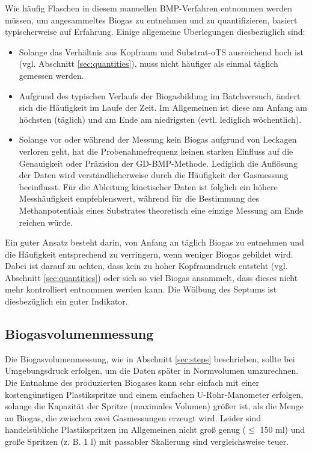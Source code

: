 \documentclass[]{article}
\begin{document}
Wie häufig Flaschen in diesem manuellen BMP-Verfahren entnommen werden müssen, um angesammeltes Biogas zu entnehmen und zu quantifizieren, basiert typischerweise auf Erfahrung.
Einige allgemeine Überlegungen diesbezüglich sind:
\begin{itemize}
\item Solange das Verhältnis aus Kopfraum und Substrat-oTS ausreichend hoch ist (vgl. Abschnitt \ref{sec:quantities}), muss nicht häufiger als einmal täglich gemessen werden.
  \item Aufgrund des typischen Verlaufs der Biogasbildung im Batchversuch, ändert sich die Häufigkeit im Laufe der Zeit. Im Allgemeinen ist diese am Anfang am höchsten (täglich) und am Ende am niedrigsten (evtl. lediglich wöchentlich).
  \item Solange vor oder während der Messung kein Biogas aufgrund von Leckagen verloren geht, hat die Probenahmefrequenz keinen starken Einfluss auf die Genauigkeit oder Präzision der GD-BMP-Methode. Lediglich die Auflösung der Daten wird verständlicherweise durch die Häufigkeit der Gasmessung beeinflusst. Für die Ableitung kinetischer Daten ist folglich ein höhere Messhäufigkeit empfehlenswert, während für die Bestimmung des Methanpotentials eines Substrates theoretisch eine einzige Messung am Ende reichen würde.
\end{itemize}

Ein guter Ansatz besteht darin, von Anfang an täglich Biogas zu entnehmen und die Häufigkeit entsprechend zu verringern, wenn weniger Biogas gebildet wird. Dabei ist darauf zu achten, dass kein zu hoher Kopfraumdruck entsteht (vgl. Abschnitt \ref{sec:quantities}) oder sich so viel Biogas ansammelt, dass dieses nicht mehr kontrolliert entnommen werden kann. Die Wölbung des Septums ist diesbezüglich ein guter Indikator.

\subsection{Biogasvolumenmessung}
\label{sec:volmeas}
Die Biogasvolumenmessung, wie in Abschnitt \ref{sec:steps} beschrieben, sollte bei Umgebungsdruck erfolgen, um die Daten später in Normvolumen umzurechnen.
Die Entnahme des produzierten Biogases kann sehr einfach mit einer kostengünstigen Plastikspritze und einem einfachen U-Rohr-Manometer erfolgen, solange die Kapazität der Spritze (maximales Volumen) größer ist, als die Menge an Biogas, die zwischen zwei Gasmessungen erzeugt wird.
Leider sind handelsübliche Plastikspritzen im Allgemeinen nicht groß genug ($\le$ 150 ml) und große Spritzen (z. B. 1 l) mit passabler Skalierung sind vergleichsweise teuer.
\end{document}
